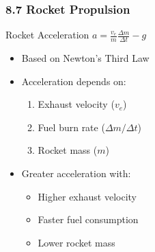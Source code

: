 \documentclass[aspectratio=169]{beamer}
\begin{document}
\begin{frame}
\frametitle{8.7 Rocket Propulsion}

\begin{block}{Rocket Acceleration}
$a = \frac{v_e}{m}\frac{\Delta m}{\Delta t} - g$
\end{block}

\begin{itemize}
\item Based on Newton's Third Law
\item Acceleration depends on:
    \begin{enumerate}
    \item Exhaust velocity ($v_e$)
    \item Fuel burn rate ($\Delta m/\Delta t$)
    \item Rocket mass ($m$)
    \end{enumerate}
\item Greater acceleration with:
    \begin{itemize}
    \item Higher exhaust velocity
    \item Faster fuel consumption
    \item Lower rocket mass
    \end{itemize}
\end{itemize}
\end{frame}

\iffalse
\begin{comment}
    

\begin{frame}
\frametitle{Example: Elastic Collision}
\framesubtitle{I Do}
A 2.0 kg ball moving at 3.0 m/s collides elastically with a 1.0 kg ball at rest.
\begin{enumerate}
\item Conservation of momentum:
    \[ (2.0)(3.0) = 2.0v_1 + 1.0v_2 \]
\item Conservation of energy:
    \[ \frac{1}{2}(2.0)(3.0)^2 = \frac{1}{2}(2.0)v_1^2 + \frac{1}{2}(1.0)v_2^2 \]
\item Solution:
    \[ v_1 = 1.0 \text{ m/s}, v_2 = 4.0 \text{ m/s} \]
\end{enumerate}
\end{frame}
\end{comment}
\fi
\end{document}
